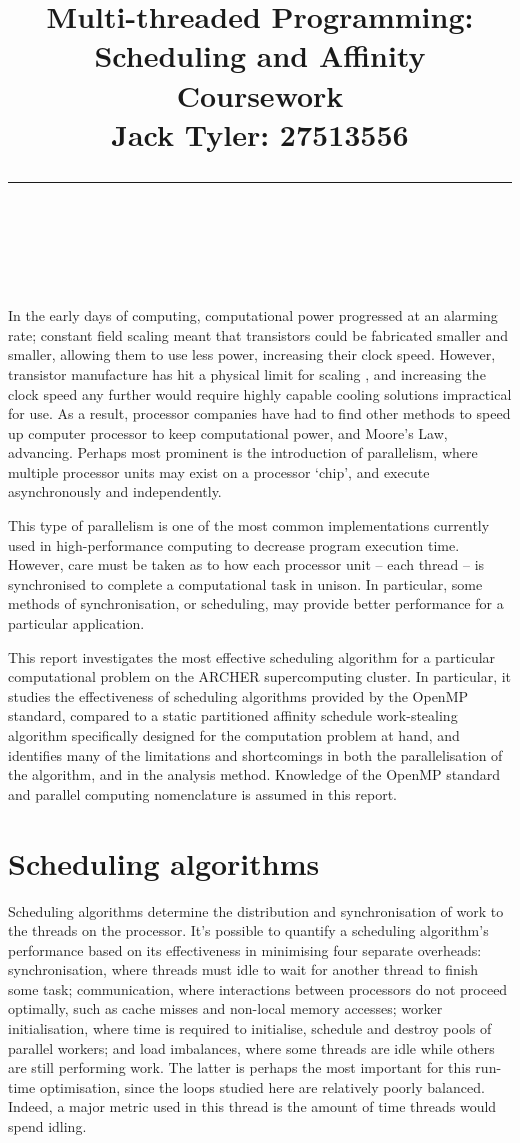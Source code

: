 \documentclass{article} %
\title{\raggedright
\normalfont \normalsize 
\huge Multi-threaded Programming: Scheduling and Affinity Coursework \\[1em]
\normalsize \normalfont Jack Tyler: 27513556 \\
\rule{\linewidth}{.5pt}  \\[6pt]
}
\begin{document}
\maketitle

In the early days of computing, computational power progressed at an alarming rate; constant field scaling meant that transistors could be fabricated smaller and smaller, allowing them to use less power, increasing their clock speed.
However, transistor manufacture has hit a physical limit for scaling \citep{Mcfarland1995}, and increasing the clock speed any further would require highly capable cooling solutions impractical for use.
As a result, processor companies have had to find other methods to speed up computer processor to keep computational power, and Moore's Law, advancing.
Perhaps most prominent is the introduction of parallelism, where multiple processor units may exist on a processor `chip', and execute asynchronously and independently.

This type of parallelism is one of the most common implementations currently used in high-performance computing to decrease program execution time.
However, care must be taken as to how each processor unit -- each thread -- is synchronised to complete a computational task in unison. In particular,
some methods of synchronisation, or scheduling, may provide better performance for a particular application.

This report investigates the most effective scheduling algorithm for a particular computational problem on the ARCHER supercomputing cluster.
In particular, it studies the effectiveness of scheduling algorithms provided by the OpenMP standard, compared to a static partitioned affinity schedule work-stealing algorithm specifically designed for the computation problem at hand, and identifies many of the limitations and shortcomings in both the parallelisation of the algorithm, and in the analysis method. Knowledge of the OpenMP standard and parallel computing nomenclature is assumed in this report.

\section*{Scheduling algorithms}

Scheduling algorithms determine the distribution and synchronisation of work to the threads on the processor.
It's possible to quantify a scheduling algorithm's performance based on its effectiveness in minimising four separate overheads:
synchronisation, where threads must idle to wait for another thread to finish some task;
communication, where interactions between processors do not proceed optimally, such as cache misses and non-local memory accesses;
worker initialisation, where time is required to initialise, schedule and destroy pools of parallel workers;
and load imbalances, where some threads are idle while others are still performing work.
The latter is perhaps the most important for this run-time optimisation, since the loops studied here are relatively poorly balanced.
Indeed, a major metric used in this thread is the amount of time threads would spend idling.
\end{document}
